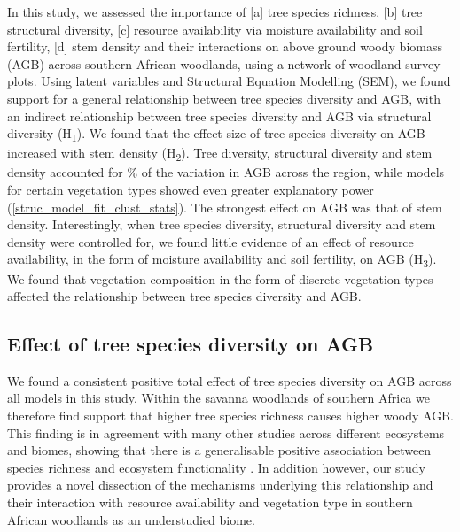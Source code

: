 \documentclass[11pt,a4paper]{article}
\begin{document}
In this study, we assessed the importance of [a] tree species richness, [b] tree structural diversity, [c] resource availability via moisture availability and soil fertility, [d] stem density and their interactions on above ground woody biomass (AGB) across southern African woodlands, using a network of \nplots{} woodland survey plots. Using latent variables and Structural Equation Modelling (SEM), we found support for a general relationship between tree species diversity and AGB, with an indirect relationship between tree species diversity and AGB via structural diversity (H\textsubscript{1}). We found that the effect size of tree species diversity on AGB increased with stem density (H\textsubscript{2}).  Tree diversity, structural diversity and stem density accounted for \srsq{}\% of the variation in AGB across the region, while models for certain vegetation types showed even greater explanatory power (\autoref{struc_model_fit_clust_stats}). The strongest effect on AGB was that of stem density. Interestingly, when tree species diversity, structural diversity and stem density were controlled for, we found little evidence of an effect of resource availability, in the form of moisture availability and soil fertility, on AGB (H\textsubscript{3}). We found that vegetation composition in the form of discrete vegetation types affected the relationship between tree species diversity and AGB.

\subsection{Effect of tree species diversity on AGB}


We found a consistent positive total effect of tree species diversity on AGB across all models in this study. Within the savanna woodlands of southern Africa we therefore find support that higher tree species richness causes higher woody AGB. This finding is in agreement with many other studies across different ecosystems and biomes, showing that there is a generalisable positive association between species richness and ecosystem functionality \citep{Liang2016, Cardinale2009}. In addition however, our study provides a novel dissection of the mechanisms underlying this relationship and their interaction with resource availability and vegetation type in southern African woodlands as an understudied biome. 
\end{document}
